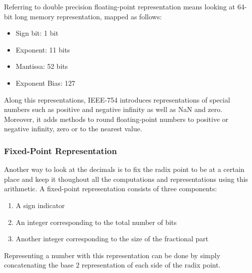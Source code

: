 Referring to double precision floating-point representation means looking at 64-bit long memory representation, mapped as follows:
\begin{itemize}
  \item Sign bit: 1 bit
  \item Exponent: 11 bits
  \item Mantissa: 52 bits
  \item Exponent Bias: 127
\end{itemize}


Along this representations, IEEE-754 introduces representations of special numbers such as positive and negative infinity as well as NaN and zero. Moreover, it adds methods to round floating-point numbers to positive or negative infinity, zero or to the nearest value.

\subsubsection{Fixed-Point Representation}

Another way to look at the decimals is to fix the radix point to be at a certain place and keep it thoughout all the computations and representations using this arithmetic. A fixed-point representation consists of three components:
\begin{enumerate}
  \item A sign indicator
  \item An integer corresponding to the total number of bits
  \item Another integer corresponding to the size of the fractional part
\end{enumerate}

Representing a number with this representation can be done by simply concatenating the base 2 representation of each side of the radix point.


